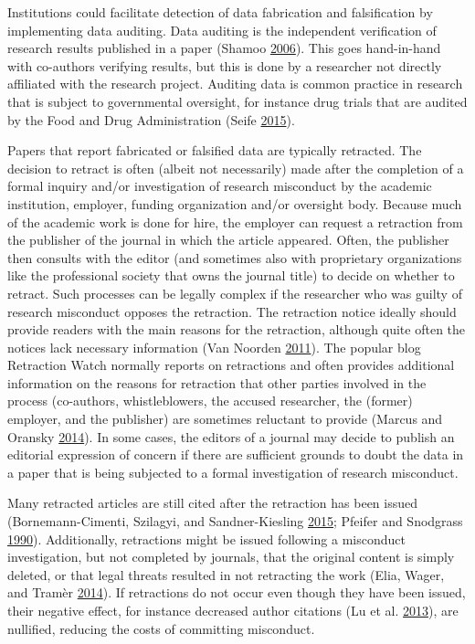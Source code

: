 \documentclass[a5paper]{book}
\begin{document}
Institutions could facilitate detection of data fabrication and
falsification by implementing data auditing. Data auditing is the
independent verification of research results published in a paper
(Shamoo \protect\hyperlink{ref-doi:10.1038ux2f439784c}{2006}). This goes
hand-in-hand with co-authors verifying results, but this is done by a
researcher not directly affiliated with the research project. Auditing
data is common practice in research that is subject to governmental
oversight, for instance drug trials that are audited by the Food and
Drug Administration (Seife
\protect\hyperlink{ref-doi:10.1001ux2fjamainternmed.2014.7774}{2015}).

Papers that report fabricated or falsified data are typically retracted.
The decision to retract is often (albeit not necessarily) made after the
completion of a formal inquiry and/or investigation of research
misconduct by the academic institution, employer, funding organization
and/or oversight body. Because much of the academic work is done for
hire, the employer can request a retraction from the publisher of the
journal in which the article appeared. Often, the publisher then
consults with the editor (and sometimes also with proprietary
organizations like the professional society that owns the journal title)
to decide on whether to retract. Such processes can be legally complex
if the researcher who was guilty of research misconduct opposes the
retraction. The retraction notice ideally should provide readers with
the main reasons for the retraction, although quite often the notices
lack necessary information (Van Noorden
\protect\hyperlink{ref-doi:10.1038ux2f478026a}{2011}). The popular blog
Retraction Watch normally reports on retractions and often provides
additional information on the reasons for retraction that other parties
involved in the process (co-authors, whistleblowers, the accused
researcher, the (former) employer, and the publisher) are sometimes
reluctant to provide (Marcus and Oransky
\protect\hyperlink{ref-doi:10.1128ux2fjmbe.v15i2.855}{2014}). In some
cases, the editors of a journal may decide to publish an editorial
expression of concern if there are sufficient grounds to doubt the data
in a paper that is being subjected to a formal investigation of research
misconduct.

Many retracted articles are still cited after the retraction has been
issued (Bornemann-Cimenti, Szilagyi, and Sandner-Kiesling
\protect\hyperlink{ref-doi:10.1007ux2fs11948-015-9680-y}{2015}; Pfeifer
and Snodgrass
\protect\hyperlink{ref-doi:10.1001ux2fjama.1990.03440100140020}{1990}).
Additionally, retractions might be issued following a misconduct
investigation, but not completed by journals, that the original content
is simply deleted, or that legal threats resulted in not retracting the
work (Elia, Wager, and Tramèr
\protect\hyperlink{ref-doi:10.1371ux2fjournal.pone.0085846}{2014}). If
retractions do not occur even though they have been issued, their
negative effect, for instance decreased author citations (Lu et al.
\protect\hyperlink{ref-doi:10.1038ux2fsrep03146}{2013}), are nullified,
reducing the costs of committing misconduct.
\end{document}
